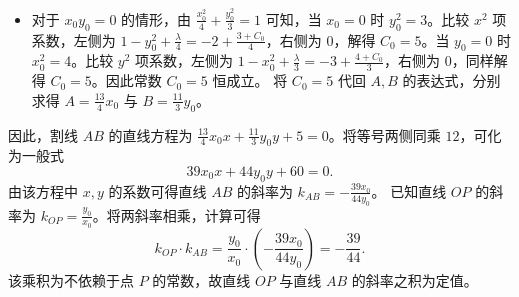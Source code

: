 \begin{solution}
\begin{itemize}
\begin{align*}
&= x_0 y_0 \left( \frac{C_0}{6} + \frac{7}{6} \right).
\end{align*}
当 $x_0 y_0 \neq 0$ 时，等式两端约去非零因子 $x_0 y_0$，得到
\[ 2 = \frac{C_0}{6} + \frac{7}{6}. \]
解得 $C_0 = 5$。
\item 对于 $x_0 y_0 = 0$ 的情形，由 $\frac{x_0^2}{4} + \frac{y_0^2}{3} = 1$ 可知，当 $x_0 = 0$ 时 $y_0^2 = 3$。比较 $x^2$ 项系数，左侧为 $1 - y_0^2 + \frac{\lambda}{4} = -2 + \frac{3 + C_0}{4}$，右侧为 $0$，解得 $C_0 = 5$。当 $y_0 = 0$ 时 $x_0^2 = 4$。比较 $y^2$ 项系数，左侧为 $1 - x_0^2 + \frac{\lambda}{3} = -3 + \frac{4 + C_0}{3}$，右侧为 $0$，同样解得 $C_0 = 5$。因此常数 $C_0 = 5$ 恒成立。
将 $C_0 = 5$ 代回 $A, B$ 的表达式，分别求得 $A = \frac{13}{4} x_0$ 与 $B = \frac{11}{3} y_0$。
\end{itemize}
因此，割线 $AB$ 的直线方程为 $\frac{13}{4} x_0 x + \frac{11}{3} y_0 y + 5 = 0$。将等号两侧同乘 $12$，可化为一般式
\[ 39x_0 x + 44y_0 y + 60 = 0. \]
由该方程中 $x,y$ 的系数可得直线 $AB$ 的斜率为 $k_{AB} = -\frac{39x_0}{44y_0}$。
已知直线 $OP$ 的斜率为 $k_{OP} = \frac{y_0}{x_0}$。将两斜率相乘，计算可得
\[ k_{OP} \cdot k_{AB} = \frac{y_0}{x_0} \cdot \left(-\frac{39x_0}{44y_0}\right) = -\frac{39}{44}. \]
该乘积为不依赖于点 $P$ 的常数，故直线 $OP$ 与直线 $AB$ 的斜率之积为定值。
\end{solution}


